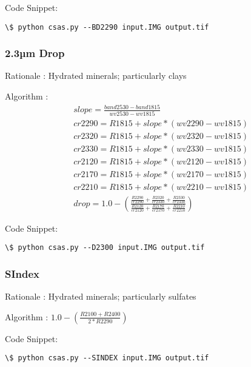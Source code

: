 \documentclass[letterpaper,10pt,english]{sphinxmanual}
\begin{document}
Code Snippet:

\begin{Verbatim}[commandchars=\\\{\}]
\$ python csas.py --BD2290 input.IMG output.tif
\end{Verbatim}


\subsubsection{2.3µm Drop}
\label{Algorithms:m-drop}
Rationale : Hydrated minerals; particularly clays

Algorithm : $$\begin{aligned}
& slope = \frac{band2530 - band1815}{wv2530 - wv1815}\nonumber\\
& cr2290 = R1815 + slope * (wv2290 - wv1815)\nonumber\\
& cr2320 = R1815 + slope * (wv2320 - wv1815)\nonumber\\
& cr2330 = R1815 + slope * (wv2330 - wv1815)\nonumber\\
& cr2120 = R1815 + slope * (wv2120 - wv1815)\nonumber\\
& cr2170 = R1815 + slope * (wv2170 - wv1815)\nonumber\\
& cr2210 = R1815 + slope * (wv2210 - wv1815)\nonumber\\
& drop = 1.0 - (\frac{\frac{R2290}{cr2290}+\frac{R2320}{cr2330}+\frac{R2330}{cr2330}}{\frac{R2120}{cr2120}+\frac{R2170}{cr2170}+\frac{R2210}{cr2210}})
\end{aligned}$$

Code Snippet:

\begin{Verbatim}[commandchars=\\\{\}]
\$ python csas.py --D2300 input.IMG output.tif
\end{Verbatim}


\subsubsection{SIndex}
\label{Algorithms:sindex}
Rationale : Hydrated minerals; particularly sulfates

Algorithm : $1.0 - (\frac{R2100 + R2400}{2 * R2290})$

Code Snippet:

\begin{Verbatim}[commandchars=\\\{\}]
\$ python csas.py --SINDEX input.IMG output.tif
\end{Verbatim}
\end{document}
